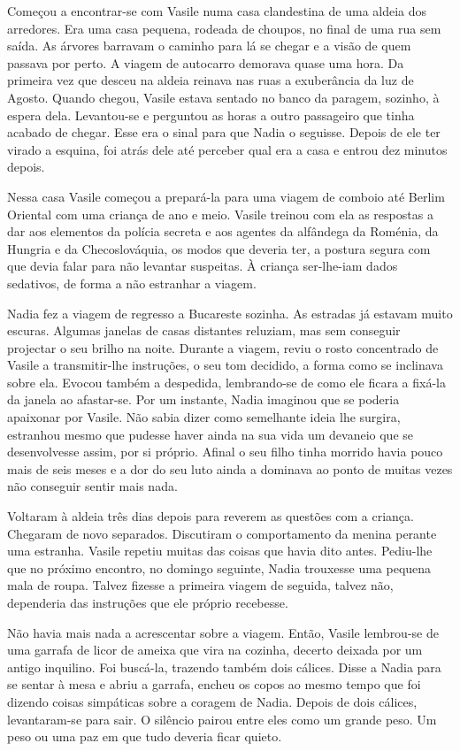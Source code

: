 Começou a encontrar-se com Vasile numa casa clandestina de uma aldeia
dos arredores. Era uma casa pequena, rodeada de choupos, no final de uma
rua sem saída. As árvores barravam o caminho para lá se chegar e a visão
de quem passava por perto. A viagem de autocarro demorava quase uma
hora. Da primeira vez que desceu na aldeia reinava nas ruas a
exuberância da luz de Agosto. Quando chegou, Vasile estava sentado no
banco da paragem, sozinho, à espera dela. Levantou-se e perguntou as
horas a outro passageiro que tinha acabado de chegar. Esse era o sinal
para que Nadia o seguisse. Depois de ele ter virado a esquina, foi atrás
dele até perceber qual era a casa e entrou dez minutos depois.

Nessa casa Vasile começou a prepará-la para uma viagem de comboio até
Berlim Oriental com uma criança de ano e meio. Vasile treinou com ela as
respostas a dar aos elementos da polícia secreta e aos agentes da
alfândega da Roménia, da Hungria e da Checoslováquia, os modos que
deveria ter, a postura segura com que devia falar para não levantar
suspeitas. À criança ser-lhe-iam dados sedativos, de forma a não
estranhar a viagem.

Nadia fez a viagem de regresso a Bucareste sozinha. As estradas já
estavam muito escuras. Algumas janelas de
casas distantes reluziam, mas sem conseguir projectar o seu brilho na
noite. Durante a viagem, reviu o rosto concentrado de Vasile a
transmitir-lhe instruções, o seu tom decidido, a forma como se inclinava
sobre ela. Evocou também a despedida, lembrando-se de como ele ficara a
fixá-la da janela ao afastar-se. Por um instante, Nadia imaginou que
se poderia apaixonar por Vasile. Não sabia dizer como semelhante ideia
lhe surgira, estranhou mesmo que pudesse haver ainda na sua vida um
devaneio que se desenvolvesse assim, por si próprio. Afinal o seu
filho tinha morrido havia pouco mais de seis meses e a dor do seu luto
ainda a dominava ao ponto de muitas vezes não conseguir sentir mais
nada.

Voltaram à aldeia três dias depois para reverem as questões com a
criança. Chegaram de novo separados. Discutiram o comportamento da
menina perante uma estranha. Vasile repetiu muitas das coisas que havia
dito antes. Pediu-lhe que no próximo encontro, no domingo seguinte,
Nadia trouxesse uma pequena mala de roupa. Talvez fizesse a primeira
viagem de seguida, talvez não, dependeria das instruções que ele
próprio recebesse.

Não havia mais nada a acrescentar sobre a viagem. Então, Vasile
lembrou-se de uma garrafa de licor de ameixa que vira na cozinha,
decerto deixada por um antigo inquilino. Foi buscá-la, trazendo também
dois cálices. Disse a Nadia para se sentar à mesa e abriu a garrafa,
encheu os copos ao mesmo tempo que foi dizendo coisas simpáticas sobre a
coragem de Nadia. Depois de dois cálices, levantaram-se para sair. O
silêncio pairou entre eles como um grande peso. Um peso ou uma paz em
que tudo deveria ficar quieto.

